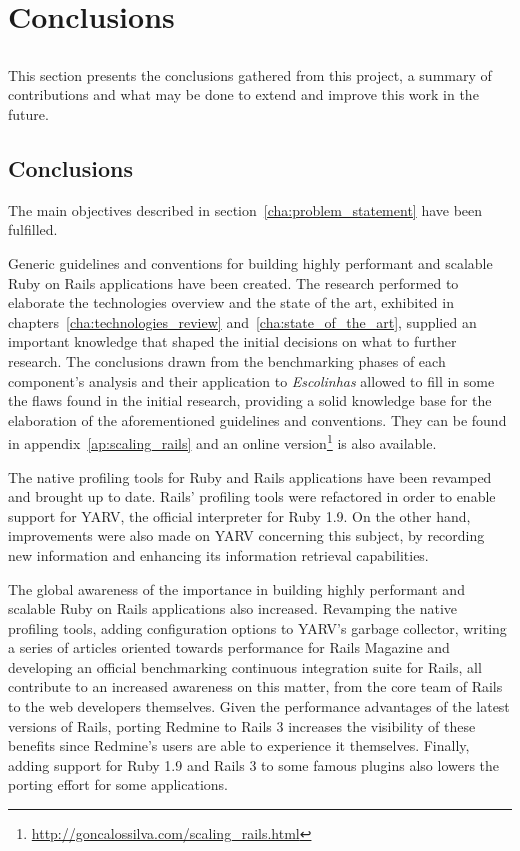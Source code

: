 \chapter{Conclusions} %
\label{cha:conclusions}
\section*{} %
This section presents the conclusions gathered from this project, a summary of contributions and what may be done to extend and improve this work in the future.

\section{Conclusions}
The main objectives described in section~\ref{cha:problem_statement} have been fulfilled.

Generic guidelines and conventions for building highly performant and scalable Ruby on Rails applications have been created. The research performed to elaborate the technologies overview and the state of the art, exhibited in chapters~\ref{cha:technologies_review} and~\ref{cha:state_of_the_art}, supplied an important knowledge that shaped the initial decisions on what to further research. The conclusions drawn from the benchmarking phases of each component's analysis and their application to \textit{Escolinhas} allowed to fill in some the flaws found in the initial research, providing a solid knowledge base for the elaboration of the aforementioned guidelines and conventions. They can be found in appendix~\ref{ap:scaling_rails} and an online version\footnote{\url{http://goncalossilva.com/scaling_rails.html}} is also available.

The native profiling tools for Ruby and Rails applications have been revamped and brought up to date. Rails' profiling tools were refactored in order to enable support for YARV, the official interpreter for Ruby 1.9. On the other hand, improvements were also made on YARV concerning this subject, by recording new information and enhancing its information retrieval capabilities.

The global awareness of the importance in building highly performant and scalable Ruby on Rails applications also increased. Revamping the native profiling tools, adding configuration options to YARV's garbage collector, writing a series of articles oriented towards performance for Rails Magazine and developing an official benchmarking continuous integration suite for Rails, all contribute to an increased awareness on this matter, from the core team of Rails to the web developers themselves. Given the performance advantages of the latest versions of Rails, porting Redmine to Rails 3 increases the visibility of these benefits since Redmine's users are able to experience it themselves. Finally, adding support for Ruby 1.9 and Rails 3 to some famous plugins also lowers the porting effort for some applications.

